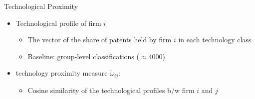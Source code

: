 \documentclass[
  aspectratio=169,  %
  handout           %
]{beamer}
\theoremstyle{plain}
\begin{document}
\begin{frame}{Technological Proximity}
  \begin{itemize}
    \item Technological profile of firm $i$
          \begin{itemize}
            \item The vector of the share of patents held by firm
            $i$ in each technology class
            \item Baseline: group-level classifications ($\approx4000$)\medskip{}
          \end{itemize}
          \medskip{}
    \item \citet{Jaffe1986-yz} technology proximity measure $\tilde{\omega}_{ij}$:
      \begin{itemize}
      \item Cosine similarity of the technological profiles b/w firm $i$ and $j$
      \end{itemize}
  \end{itemize}
\end{frame}
\end{document}
